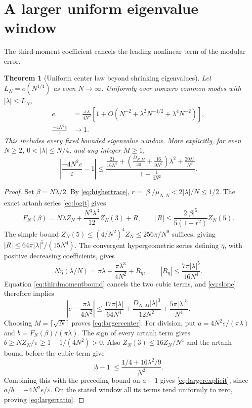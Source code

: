 \documentclass[10pt]{article}
\newtheorem{theorem}{Theorem}
\begin{document}
\section{A larger uniform eigenvalue window}

The third-moment coefficient cancels the leading nonlinear term
of the modular error.
\begin{theorem}[Uniform center law beyond shrinking eigenvalues]
Let $L_N=o(N^{1/4})$ as even $N\to\infty$. Uniformly over nonzero
common modes with $|\lambda|\le L_N$,
\begin{align}
e&=\frac{\pi\lambda}{4N^2}
\left[1+O\left(N^{-2}+\lambda^2N^{-1/2}
+\lambda^4N^{-2}\right)\right],\label{eq:largercenter}\\
\frac{-4N^2e}{\varepsilon}&\longrightarrow1.
\label{eq:largerratio}
\end{align}
This includes every fixed bounded eigenvalue window. More explicitly,
for even $N\ge2$, $0<|\lambda|\le N/4$, and any integer $M\ge1$,
\begin{equation}
\left|\frac{-4N^2e}{\varepsilon}-1\right|
\le
\frac{\displaystyle
\frac{21}{16N^2}
+\left(\frac{D_{N,M}}{3\pi}+\frac{16}{9N^2}\right)\lambda^2
+\frac{20\lambda^4}{N^2}}
{\displaystyle1-\frac1{4N^2}}.
\label{eq:largerexplicit}
\end{equation}
\end{theorem}
\begin{proof}
Set $\beta=N\lambda/2$. By \eqref{eq:highertrace},
$r=|\beta|/\mu_{N,N}<2|\lambda|/N\le1/2$.
The exact artanh series \eqref{eq:logit} gives
\[
F_N(\beta)=N\lambda Z_N+\frac{N^3\lambda^3}{12}Z_N(3)+R,
\qquad
|R|\le\frac{2|\beta|^5}{5(1-r^2)}Z_N(5).
\]
The simple bound $Z_N(5)\le(4/N^2)^4Z_N\le256\pi/N^9$
suffices, giving $|R|\le64\pi|\lambda|^5/(15N^4)$.
The convergent hypergeometric series defining $\eta$, with positive
decreasing coefficients, gives
\[
N\eta(\lambda/N)=\pi\lambda+\frac{\pi\lambda^3}{4N^2}
+R_\eta,\qquad |R_\eta|\le\frac{7\pi|\lambda|^5}{16N^4}.
\]
Equation \eqref{eq:thirdmomentbound} cancels the two cubic terms,
and \eqref{eq:slope} therefore implies
\[
\left|e-\frac{\pi\lambda}{4N^2}\right|
\le\frac{17\pi|\lambda|}{64N^4}
+\frac{D_{N,M}|\lambda|^3}{12N^2}
+\frac{5\pi|\lambda|^5}{N^4}.
\]
Choosing $M=\lceil\sqrt N\rceil$ proves \eqref{eq:largercenter}.
For division, put $a=4N^2e/(\pi\lambda)$ and
$b=F_N(\beta)/(\pi\lambda)$.
The sign of every artanh term gives
$b\ge NZ_N/\pi\ge1-1/(4N^2)>0$.
Also $Z_N(3)\le16Z_N/N^4$ and the artanh bound before the
cubic term give
\[
|b-1|\le\frac{1/4+16\lambda^2/9}{N^2}.
\]
Combining this with the preceding bound on $a-1$ gives
\eqref{eq:largerexplicit}, since $a/b=-4N^2e/\varepsilon$.
On the stated window all its terms tend uniformly to zero,
proving \eqref{eq:largerratio}.
\end{proof}
\end{document}
